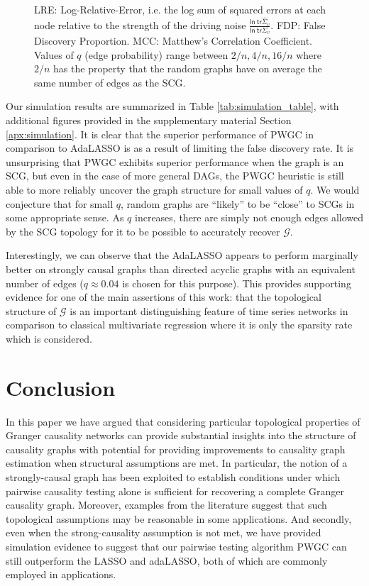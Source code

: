 \documentclass{statsoc}
\def\gcg{\mathcal{G}}  %
\def\ln{\mathsf{ln\ }}  %
\def\tr{\mathsf{tr }}  %
\begin{document}
\begin{figure}[!h]
{    LRE: Log-Relative-Error, i.e. the log sum of squared errors at
    each node relative to the strength of the driving noise
    $\frac{\ln \tr \widehat{\Sigma}_v}{\ln \tr \Sigma_v}$.  FDP: False
    Discovery Proportion.  MCC: Matthew's Correlation Coefficient.\\

    Values of $q$ (edge probability) range between
    $2 / n, 4 / n, 16 / n$ where $2 / n$ has the property that the
    random graphs have on average the same number of edges as the
    SCG.}
\end{figure}

Our simulation results are summarized in Table
\ref{tab:simulation_table}, with additional figures provided in the
supplementary material Section \ref{apx:simulation}.  It is clear that
the superior performance of PWGC in comparison to AdaLASSO is as a
result of limiting the false discovery rate.  It is unsurprising that
PWGC exhibits superior performance when the graph is an SCG, but even
in the case of more general DAGs, the PWGC heuristic is still able to
more reliably uncover the graph structure for small values of $q$.  We
would conjecture that for small $q$, random graphs are ``likely'' to
be ``close'' to SCGs in some appropriate sense.  As $q$ increases,
there are simply not enough edges allowed by the SCG topology for it
to be possible to accurately recover $\gcg$.

Interestingly, we can observe that the AdaLASSO appears to perform
marginally better on strongly causal graphs than directed acyclic
graphs with an equivalent number of edges ($q \approx 0.04$ is chosen for
this purpose).  This provides supporting evidence for one of the main
assertions of this work: that the topological structure of $\gcg$ is
an important distinguishing feature of time series networks in
comparison to classical multivariate regression where it is only the
sparsity rate which is considered.

\section{Conclusion}
\label{sec:conclusion}
In this paper we have argued that considering particular topological
properties of Granger causality networks can provide substantial
insights into the structure of causality graphs with potential for
providing improvements to causality graph estimation when structural
assumptions are met.  In particular, the notion of a strongly-causal
graph has been exploited to establish conditions under which pairwise
causality testing alone is sufficient for recovering a complete
Granger causality graph.  Moreover, examples from the literature
suggest that such topological assumptions may be reasonable in some
applications.  And secondly, even when the strong-causality assumption
is not met, we have provided simulation evidence to suggest that our
pairwise testing algorithm PWGC can still outperform the LASSO and
adaLASSO, both of which are commonly employed in applications.
\end{document}
